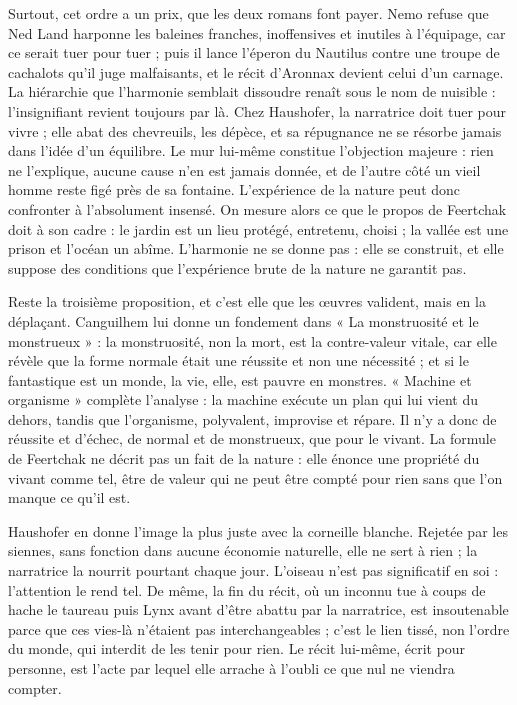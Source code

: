 \documentclass[11pt,a4paper]{article}
\begin{document}
Surtout, cet ordre a un prix, que les deux romans font payer. Nemo refuse que Ned Land harponne les baleines franches, inoffensives et inutiles à l'équipage, car ce serait tuer pour tuer ; puis il lance l'éperon du Nautilus contre une troupe de cachalots qu'il juge malfaisants, et le récit d'Aronnax devient celui d'un carnage. La hiérarchie que l'harmonie semblait dissoudre renaît sous le nom de nuisible : l'insignifiant revient toujours par là. Chez Haushofer, la narratrice doit tuer pour vivre ; elle abat des chevreuils, les dépèce, et sa répugnance ne se résorbe jamais dans l'idée d'un équilibre. Le mur lui-même constitue l'objection majeure : rien ne l'explique, aucune cause n'en est jamais donnée, et de l'autre côté un vieil homme reste figé près de sa fontaine. L'expérience de la nature peut donc confronter à l'absolument insensé. On mesure alors ce que le propos de Feertchak doit à son cadre : le jardin est un lieu protégé, entretenu, choisi ; la vallée est une prison et l'océan un abîme. L'harmonie ne se donne pas : elle se construit, et elle suppose des conditions que l'expérience brute de la nature ne garantit pas.

Reste la troisième proposition, et c'est elle que les œuvres valident, mais en la déplaçant. Canguilhem lui donne un fondement dans « La monstruosité et le monstrueux » : la monstruosité, non la mort, est la contre-valeur vitale, car elle révèle que la forme normale était une réussite et non une nécessité ; et si le fantastique est un monde, la vie, elle, est pauvre en monstres. « Machine et organisme » complète l'analyse : la machine exécute un plan qui lui vient du dehors, tandis que l'organisme, polyvalent, improvise et répare. Il n'y a donc de réussite et d'échec, de normal et de monstrueux, que pour le vivant. La formule de Feertchak ne décrit pas un fait de la nature : elle énonce une propriété du vivant comme tel, être de valeur qui ne peut être compté pour rien sans que l'on manque ce qu'il est.

Haushofer en donne l'image la plus juste avec la corneille blanche. Rejetée par les siennes, sans fonction dans aucune économie naturelle, elle ne sert à rien ; la narratrice la nourrit pourtant chaque jour. L'oiseau n'est pas significatif en soi : l'attention le rend tel. De même, la fin du récit, où un inconnu tue à coups de hache le taureau puis Lynx avant d'être abattu par la narratrice, est insoutenable parce que ces vies-là n'étaient pas interchangeables ; c'est le lien tissé, non l'ordre du monde, qui interdit de les tenir pour rien. Le récit lui-même, écrit pour personne, est l'acte par lequel elle arrache à l'oubli ce que nul ne viendra compter.
\end{document}
